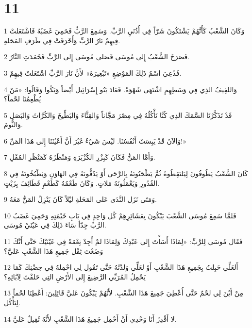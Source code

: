 \chapter{11}

\par 1 وَكَانَ الشَّعْبُ كَأَنَّهُمْ يَشْتَكُونَ شَرّاً فِي أُذُنَيِ الرَّبِّ. وَسَمِعَ الرَّبُّ فَحَمِيَ غَضَبُهُ فَاشْتَعَلتْ فِيهِمْ نَارُ الرَّبِّ وَأَحْرَقَتْ فِي طَرَفِ المَحَلةِ.
\par 2 فَصَرَخَ الشَّعْبُ إِلى مُوسَى فَصَلى مُوسَى إِلى الرَّبِّ فَخَمَدَتِ النَّارُ.
\par 3 فَدُعِيَ اسْمُ ذَلِكَ المَوْضِعِ «تَبْعِيرَةَ» لأَنَّ نَارَ الرَّبِّ اشْتَعَلتْ فِيهِمْ.
\par 4 وَاللفِيفُ الذِي فِي وَسَطِهِمِ اشْتَهَى شَهْوَةً. فَعَادَ بَنُو إِسْرَائِيل أَيْضاً وَبَكُوا وَقَالُوا: «مَنْ يُطْعِمُنَا لحْماً؟
\par 5 قَدْ تَذَكَّرْنَا السَّمَكَ الذِي كُنَّا نَأْكُلُهُ فِي مِصْرَ مَجَّاناً وَالقِثَّاءَ وَالبَطِّيخَ وَالكُرَّاثَ وَالبَصَل وَالثُّومَ.
\par 6 وَالآنَ قَدْ يَبِسَتْ أَنْفُسُنَا. ليْسَ شَيْءٌ غَيْرَ أَنَّ أَعْيُنَنَا إِلى هَذَا المَنِّ!»
\par 7 وَأَمَّا المَنُّ فَكَانَ كَبِزْرِ الكُزْبَرَةِ وَمَنْظَرُهُ كَمَنْظَرِ المُقْلِ.
\par 8 كَانَ الشَّعْبُ يَطُوفُونَ لِيَلتَقِطُوهُ ثُمَّ يَطْحَنُونَهُ بِالرَّحَى أَوْ يَدُقُّونَهُ فِي الهَاوَنِ وَيَطْبُخُونَهُ فِي القُدُورِ وَيَعْمَلُونَهُ مَلاتٍ. وَكَانَ طَعْمُهُ كَطَعْمِ قَطَائِفَ بِزَيْتٍ.
\par 9 وَمَتَى نَزَل النَّدَى عَلى المَحَلةِ ليْلاً كَانَ يَنْزِلُ المَنُّ مَعَهُ.
\par 10 فَلمَّا سَمِعَ مُوسَى الشَّعْبَ يَبْكُونَ بِعَشَائِرِهِمْ كُل وَاحِدٍ فِي بَابِ خَيْمَتِهِ وَحَمِيَ غَضَبُ الرَّبِّ جِدّاً سَاءَ ذَلِكَ فِي عَيْنَيْ مُوسَى.
\par 11 فَقَال مُوسَى لِلرَّبِّ: «لِمَاذَا أَسَأْتَ إِلى عَبْدِكَ وَلِمَاذَا لمْ أَجِدْ نِعْمَةً فِي عَيْنَيْكَ حَتَّى أَنَّكَ وَضَعْتَ ثِقْل جَمِيعِ هَذَا الشَّعْبِ عَليَّ؟
\par 12 أَلعَلِّي حَبِلتُ بِجَمِيعِ هَذَا الشَّعْبِ أَوْ لعَلِّي وَلدْتُهُ حَتَّى تَقُول لِي احْمِلهُ فِي حِضْنِكَ كَمَا يَحْمِلُ المُرَبِّي الرَّضِيعَ إِلى الأَرْضِ التِي حَلفْتَ لِآبَائِهِ؟
\par 13 مِنْ أَيْنَ لِي لحْمٌ حَتَّى أُعْطِيَ جَمِيعَ هَذَا الشَّعْبِ. لأَنَّهُمْ يَبْكُونَ عَليَّ قَائِلِينَ: أَعْطِنَا لحْماً لِنَأْكُل.
\par 14 لا أَقْدِرُ أَنَا وَحْدِي أَنْ أَحْمِل جَمِيعَ هَذَا الشَّعْبِ لأَنَّهُ ثَقِيلٌ عَليَّ.
